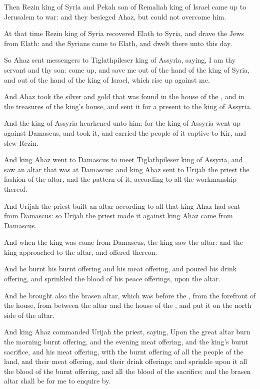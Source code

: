 \Verse Then Rezin king of Syria and Pekah son of Remaliah king of Israel came up to Jerusalem to war: and they besieged Ahaz, but could not overcome him.

\Verse At that time Rezin king of Syria recovered Elath to Syria, and drave the Jews from Elath: and the Syrians came to Elath, and dwelt there unto this day.

\Verse So Ahaz sent messengers to Tiglathpileser king of Assyria, saying, I am thy servant and thy son: come up, and save me out of the hand of the king of Syria, and out of the hand of the king of Israel, which rise up against me.

\Verse And Ahaz took the silver and gold that was found in the house of the \LORD, and in the treasures of the king's house, and sent it for a present to the king of Assyria.

\Verse And the king of Assyria hearkened unto him: for the king of Assyria went up against Damascus, and took it, and carried the people of it captive to Kir, and slew Rezin.

\Verse And king Ahaz went to Damascus to meet Tiglathpileser king of Assyria, and saw an altar that was at Damascus: and king Ahaz sent to Urijah the priest the fashion of the altar, and the pattern of it, according to all the workmanship thereof.

\Verse And Urijah the priest built an altar according to all that king Ahaz had sent from Damascus: so Urijah the priest made it against king Ahaz came from Damascus.

\Verse And when the king was come from Damascus, the king saw the altar: and the king approached to the altar, and offered thereon.

\Verse And he burnt his burnt offering and his meat offering, and poured his drink offering, and sprinkled the blood of his peace offerings, upon the altar.

\Verse And he brought also the brasen altar, which was before the \LORD, from the forefront of the house, from between the altar and the house of the \LORD, and put it on the north side of the altar.

\Verse And king Ahaz commanded Urijah the priest, saying, Upon the great altar burn the morning burnt offering, and the evening meat offering, and the king's burnt sacrifice, and his meat offering, with the burnt offering of all the people of the land, and their meat offering, and their drink offerings; and sprinkle upon it all the blood of the burnt offering, and all the blood of the sacrifice: and the brasen altar shall be for me to enquire by.

